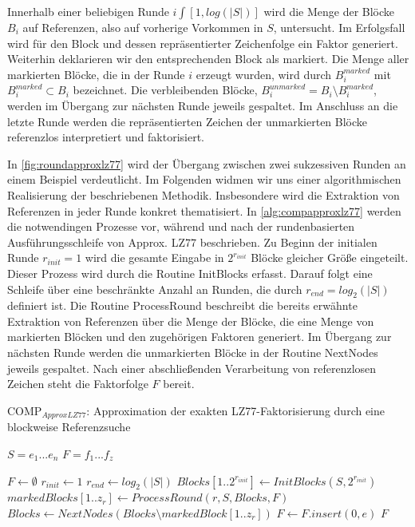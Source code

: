 Innerhalb einer beliebigen Runde $i\int [1,log(|S|)]$ wird die Menge der Blöcke $B_i$ auf Referenzen, also auf vorherige Vorkommen in $S$, untersucht. Im Erfolgsfall wird für den Block und
dessen repräsentierter Zeichenfolge ein Faktor generiert. Weiterhin deklarieren wir den entsprechenden Block als markiert. Die Menge aller markierten Blöcke, die in der Runde $i$
erzeugt wurden, wird durch $B_i^{marked}$ mit $B_i^{marked}\subset B_i$ bezeichnet. Die verbleibenden Blöcke, $B_i^{unmarked}=B_i\setminus B_i^{marked}$, werden im Übergang
zur nächsten Runde jeweils gespaltet. Im Anschluss an die letzte Runde werden die repräsentierten Zeichen der unmarkierten Blöcke referenzlos interpretiert und faktorisiert.

In \ref{fig:roundapproxlz77} wird der Übergang zwischen zwei sukzessiven Runden an einem Beispiel verdeutlicht. Im Folgenden widmen wir uns einer algorithmischen Realisierung der beschriebenen
Methodik. Insbesondere wird die Extraktion von Referenzen in jeder Runde konkret thematisiert.
In \ref{alg:compapproxlz77} werden die notwendingen Prozesse vor, während und nach der rundenbasierten Ausführungsschleife von Approx. LZ77 beschrieben. Zu Beginn der initialen
Runde $r_{init}=1$ wird die gesamte Eingabe in $2^{r_{init}}$ Blöcke gleicher Größe eingeteilt. Dieser Prozess wird durch die Routine InitBlocks erfasst. Darauf folgt eine Schleife
über eine beschränkte Anzahl an Runden, die durch $r_{end}=log_2(|S|)$ definiert ist. Die Routine ProcessRound beschreibt die bereits erwähnte Extraktion von Referenzen über die
Menge der Blöcke, die eine Menge von markierten Blöcken und den zugehörigen Faktoren generiert. Im Übergang zur nächsten Runde werden die unmarkierten Blöcke in der Routine 
NextNodes jeweils gespaltet. Nach einer abschließenden Verarbeitung von referenzlosen Zeichen steht die Faktorfolge $F$ bereit.

\begin{algorithm}[ht]
\centering
\caption{COMP$_{ApproxLZ77}$: Approximation der exakten LZ77-Faktorisierung durch eine blockweise Referenzsuche} \label{alg:compapproxlz77}
\algorithmicrequire $S=e_1...e_n$
\algorithmicensure $F=f_1...f_z$
\begin{algorithmic}[1]
    \STATE $F \gets \emptyset$
    \STATE $r_{init} \gets 1$
    \STATE $r_{end} \gets log_2(|S|)$
    \STATE $Blocks[1..2^{r_{init}}] \gets InitBlocks(S, 2^{r_{init}})$ 
        \STATE $markedBlocks[1..z_r] \gets ProcessRound(r, S, Blocks, F)$
        \STATE $Blocks \gets NextNodes(Blocks\setminus markedBlock[1..z_r])$ 
    \ENDFOR
        \STATE $F \gets F.insert(0, e)$ 
    \ENDFOR
    \RETURN $F$
\end{algorithmic}
\end{algorithm}

